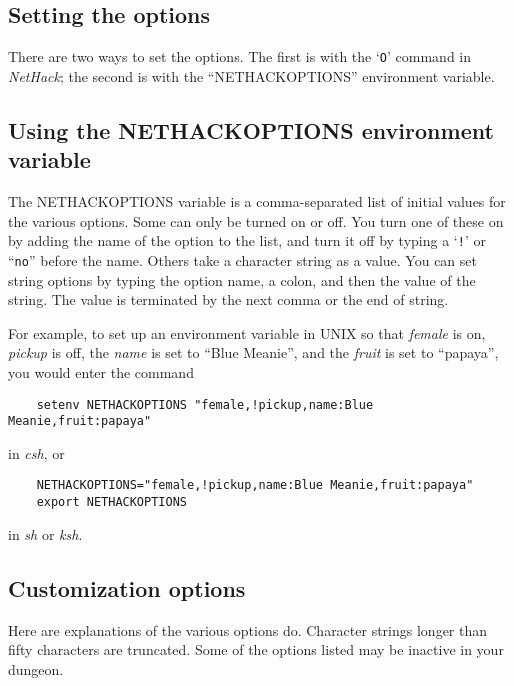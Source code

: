 \subsection*{Setting the options}

There are two ways to set the options.  The first is with the `{\tt O}'
command in {\it NetHack}; the second is with the ``NETHACKOPTIONS''
environment variable.

\subsection*{Using the NETHACKOPTIONS environment variable}

The NETHACKOPTIONS variable is a comma-separated list of initial
values for the various options.  Some can only be turned on or off.
You turn one of these on by adding the name of the option to the list,
and turn it off by typing a `{\tt !}' or ``{\tt no}'' before the name.
Others take a
character string as a value.  You can set string options by typing
the option name, a colon, and then the value of the string.  The value
is terminated by the next comma or the end of string.

For example, to set up an environment variable in UNIX so that {\it female\/}
is on, {\it pickup\/} is off, the {\it name\/} is set to ``Blue Meanie'', and
the {\it fruit\/} is set to ``papaya'', you would enter the command
\begin{verbatim}
    setenv NETHACKOPTIONS "female,!pickup,name:Blue Meanie,fruit:papaya"
\end{verbatim}
\nd in {\it csh}, or
\begin{verbatim}
    NETHACKOPTIONS="female,!pickup,name:Blue Meanie,fruit:papaya"
    export NETHACKOPTIONS
\end{verbatim}
\nd in {\it sh\/} or {\it ksh}.

\subsection*{Customization options}

Here are explanations of the various options do.  Character strings
longer than fifty characters are truncated.  Some of the options
listed may be inactive in your dungeon.

